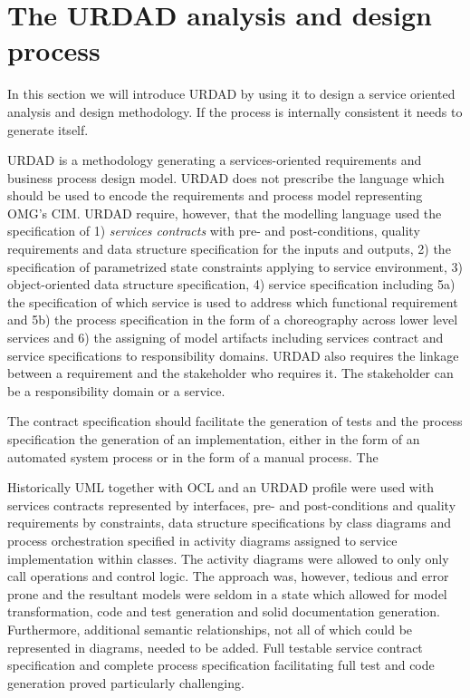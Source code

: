 \section{The URDAD analysis and design process}

In this section we will introduce URDAD by using it to design a service oriented analysis and design methodology. If the process is internally consistent it needs to generate itself. 

URDAD is a methodology generating a services-oriented requirements and business process design model. URDAD does not prescribe the language which should be used to encode the requirements and process model representing OMG's CIM. URDAD require, however, that the modelling language used the specification of 1) \emph{services contracts} with pre- and post-conditions, quality requirements and data structure specification for the inputs and outputs, 2) the specification of parametrized state constraints applying to service environment, 3) object-oriented data structure specification, 4) service specification including 5a) the specification of which service is used to address which functional requirement and 5b) the process specification in the form of a choreography across lower level services and 6) the assigning of model artifacts including services contract and service specifications to responsibility domains. URDAD also requires the linkage between a requirement and the stakeholder who requires it. The stakeholder can be a responsibility domain or a service.

The contract specification should facilitate the generation of tests and the process specification the generation of an implementation, either in the form of an automated system process or in the form of a manual process. The


Historically UML together with OCL and an URDAD profile were used with services contracts represented by interfaces, pre- and post-conditions and quality requirements by constraints, data structure specifications by class diagrams and process orchestration specified in activity diagrams assigned to service implementation within classes. The activity diagrams were allowed to only only call operations and control logic. The approach was, however, tedious and error prone and the resultant models were seldom in a state which allowed for model transformation, code and test generation and solid documentation generation. Furthermore, additional semantic relationships, not all of which could be represented in diagrams, needed to be added. Full testable service contract specification and complete process specification facilitating full test and code generation proved particularly challenging.

